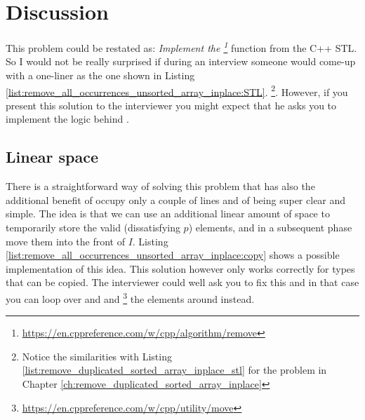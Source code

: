 \section{Discussion}
\label{remove_all_occurrences_unsorted_array_inplace:sec:discussion}
This problem could be restated as: \textit{Implement the
\footnote{\url{https://en.cppreference.com/w/cpp/algorithm/remove}}} function from
the C++ STL. So I would not be really surprised if during an interview someone would come-up with a
one-liner as the one shown in Listing \ref{list:remove_all_occurrences_unsorted_array_inplace:STL}.
\footnote{Notice the similarities with Listing \ref{list:remove_duplicated_sorted_array_inplace_stl} for the problem in Chapter \ref{ch:remove_duplicated_sorted_array_inplace}}.
However, if you present this solution to the interviewer you might expect that he asks you to implement the logic behind .




\subsection{Linear space}
\label{remove_all_occurrences_unsorted_array_inplace:sec:bruteforce}
There is a straightforward way of solving this problem that has also the additional benefit of occupy only a couple of lines and of being 
super clear and simple. The idea is that we can use an additional linear amount of space to temporarily store the valid (dissatisfying $p$) elements, and
in a subsequent phase move them into the front of $I$. Listing \ref{list:remove_all_occurrences_unsorted_array_inplace:copy} shows a possible implementation of this idea.
This solution however only works correctly for types that can be copied. The interviewer could well ask you to fix this and in that case you can 
loop over  and  and \footnote{\url{https://en.cppreference.com/w/cpp/utility/move}} the elements around instead.


